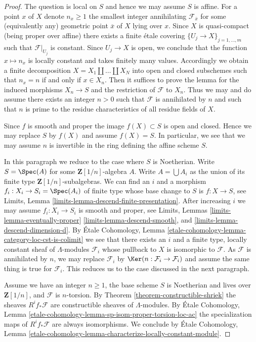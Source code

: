 \begin{proof}
The question is local on $S$ and hence we may assume $S$ is affine.
For a point $x$ of $X$ denote $n_x \geq 1$
the smallest integer annihilating $\mathcal{F}_{\overline{x}}$
for some (equivalently any) geometric point $\overline{x}$ of $X$
lying over $x$. Since $X$ is quasi-compact (being proper over affine)
there exists a finite \'etale covering $\{U_j \to X\}_{j = 1, \ldots, m}$
such that $\mathcal{F}|_{U_j}$ is constant. Since $U_j \to X$
is open, we conclude that the function $x \mapsto n_x$ is locally
constant and takes finitely many values. Accordingly we
obtain a finite decomposition $X = X_1 \amalg \ldots \amalg X_N$
into open and closed subschemes such that $n_x = n$ if and only if $x \in X_n$.
Then it suffices to prove the lemma for the induced
morphisms $X_n \to S$ and the restriction of $\mathcal{F}$ to $X_n$.
Thus we may and do assume there exists an integer $n > 0$ such
that $\mathcal{F}$ is annihilated by $n$ and such that $n$
is prime to the residue characteristics of all residue fields of $X$.

\medskip\noindent
Since $f$ is smooth and proper the image $f(X) \subset S$ is open and closed.
Hence we may replace $S$ by $f(X)$ and assume $f(X) = S$. In particular,
we see that we may assume $n$ is invertible in the ring defining the
affine scheme $S$.

\medskip\noindent
In this paragraph we reduce to the case where $S$ is Noetherian.
Write $S = \Spec(A)$ for some $\mathbf{Z}[1/n]$-algebra $A$.
Write $A = \bigcup A_i$ as the union of its finite type
$\mathbf{Z}[1/n]$-subalgebras. We can find an $i$ and a morphism
$f_i : X_i \to S_i = \Spec(A_i)$ of finite
type whose base change to $S$ is $f : X \to S$, see
Limits, Lemma \ref{limits-lemma-descend-finite-presentation}.
After increasing $i$ we may assume $f_i : X_i \to S_i$ is
smooth and proper, see Limits, Lemmas
\ref{limits-lemma-eventually-proper}
\ref{limits-lemma-descend-smooth}, and
\ref{limits-lemma-descend-dimension-d}.
By \'Etale Cohomology, Lemma
\ref{etale-cohomology-lemma-category-loc-cst-is-colimit}
we see that there exists an $i$ and a finite type,
locally constant sheaf of $\Lambda$-modules
$\mathcal{F}_i$ whose pullback to $X$ is isomorphic to $\mathcal{F}$.
As $\mathcal{F}$ is annihilated by $n$, we may replace
$\mathcal{F}_i$ by $\Ker(n : \mathcal{F}_i \to \mathcal{F}_i)$
and assume the same thing is true for $\mathcal{F}_i$.
This reduces us to the case discussed in the next paragraph.

\medskip\noindent
Assume we have an integer $n \geq 1$, the base scheme $S$ is Noetherian
and lives over $\mathbf{Z}[1/n]$, and $\mathcal{F}$ is $n$-torsion.
By Theorem \ref{theorem-constructible-shriek}
the sheaves $R^if_*\mathcal{F}$ are constructible sheaves of $\Lambda$-modules.
By \'Etale Cohomology, Lemma
\ref{etale-cohomology-lemma-sp-isom-proper-torsion-loc-ac}
the specialization maps of $R^if_*\mathcal{F}$ are always isomorphisms.
We conclude by \'Etale Cohomology, Lemma
\ref{etale-cohomology-lemma-characterize-locally-constant-module}.
\end{proof}
